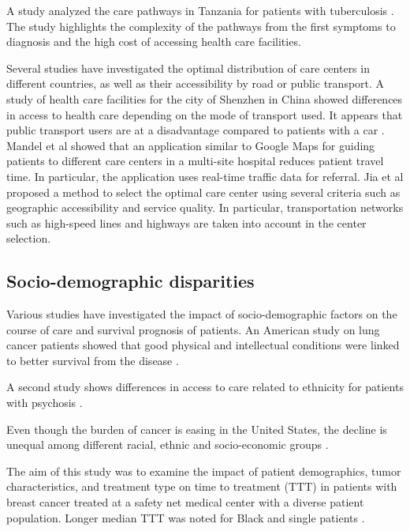 A study analyzed the care pathways in Tanzania for patients with tuberculosis
\cite{mhalu_pathways_2019}. The study highlights the complexity of the pathways
from the first symptoms to diagnosis and the high cost of accessing health care
facilities.

Several studies have investigated the optimal distribution of care centers in
different countries, as well as their accessibility by road or public transport.
A study of health care facilities for the city of Shenzhen in China showed
differences in access to health care depending on the mode of transport used. It
appears that public transport users are at a disadvantage compared to patients
with a car \cite{tao_spatial_2018}. Mandel et al \cite{mandel_optimizing_2018}
showed that an application similar to Google Maps for guiding patients to
different care centers in a multi-site hospital reduces patient travel time. In
particular, the application uses real-time traffic data for referral. Jia et al
\cite{jia_selecting_2014} proposed a method to select the optimal care center
using several criteria such as geographic accessibility and service quality. In
particular, transportation networks such as high-speed lines and highways are
taken into account in the center selection.

\subsection*{Socio-demographic disparities}

Various studies have investigated the impact of socio-demographic factors on the
course of care and survival prognosis of patients. An American study on lung
cancer patients showed that good physical and intellectual conditions were
linked to better survival from the disease
\cite{pierzynski_socio-demographic_2018}.

A second study shows differences in access to care related to ethnicity for
patients with psychosis \cite{anderson_meta-analysis_2014}.

Even though the burden of cancer is easing in the United States, the decline is
unequal among different racial, ethnic and socio-economic groups
\cite{viswanath_science_2005}.

The aim of this study was to examine the impact of patient demographics, tumor
characteristics, and treatment type on time to treatment (TTT) in patients with
breast cancer treated at a safety net medical center with a diverse patient
population. Longer median TTT was noted for Black and single patients
\cite{khanna_impact_2017}.

